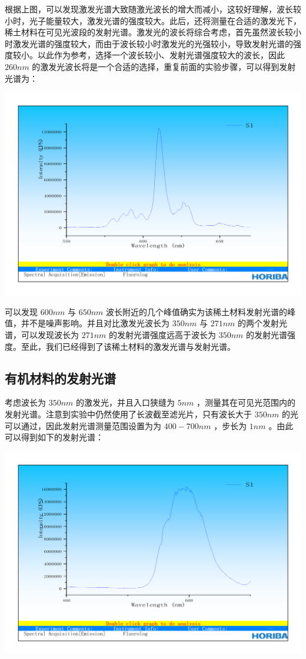 \documentclass[hyperref]{ctexart}
\begin{document}
\begin{multicols}{2}
		根据上图，可以发现激发光谱大致随激光波长的增大而减小，这较好理解，波长较小时，光子能量较大，激发光谱的强度较大。此后，还将测量在合适的激发光下，稀土材料在可见光波段的发射光谱。激发光的波长将综合考虑，首先虽然波长较小时激发光谱的强度较大，而由于波长较小时激发光的光强较小，导致发射光谱的强度较小。以此作为参考，选择一个波长较小、发射光谱强度较大的波长，因此 $260nm$ 的激发光波长将是一个合适的选择，重复前面的实验步骤，可以得到发射光谱为：
		
		\includegraphics[width = 0.75\linewidth]{RE_Emission_Spectroscopy_550-670_260.png}
		
		可以发现 $600nm$ 与 $650nm$ 波长附近的几个峰值确实为该稀土材料发射光谱的峰值，并不是噪声影响。并且对比激发光波长为 $350nm$ 与 $271nm$ 的两个发射光谱，可以发现波长为 $271nm$ 的发射光谱强度远高于波长为 $350nm$ 的发射光谱强度。至此，我们已经得到了该稀土材料的激发光谱与发射光谱。
		
		\subsection{有机材料的发射光谱}
		考虑波长为 $350nm$ 的激发光，并且入口狭缝为 $5nm$ ，测量其在可见光范围内的发射光谱。注意到实验中仍然使用了长波截至滤光片，只有波长大于 $350nm$ 的光可以通过，因此发射光谱测量范围设置为为 $400-700nm$ ，步长为 $1nm$ 。由此可以得到如下的发射光谱：
		
		\includegraphics[width = 0.75\linewidth]{OR_Emission_Spectroscopy_400-700_350.png}
		

\end{multicols}
\end{document}
